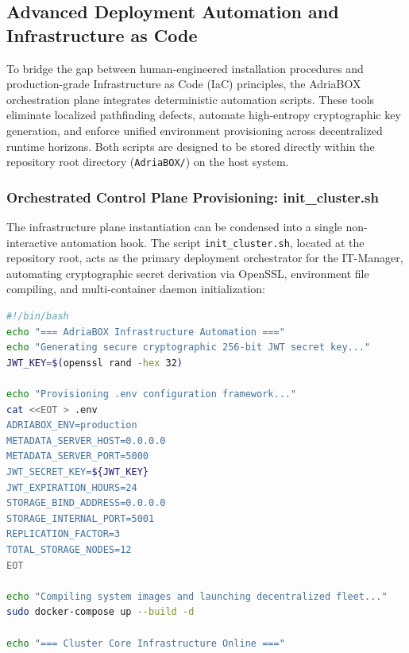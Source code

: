 \subsection{Advanced Deployment Automation and Infrastructure as Code}
To bridge the gap between human-engineered installation procedures and production-grade Infrastructure as Code (IaC) principles, the AdriaBOX orchestration plane integrates deterministic automation scripts. These tools eliminate localized pathfinding defects, automate high-entropy cryptographic key generation, and enforce unified environment provisioning across decentralized runtime horizons. Both scripts are designed to be stored directly within the repository root directory (\texttt{AdriaBOX/}) on the host system.

\subsubsection{Orchestrated Control Plane Provisioning: init\_cluster.sh}
The infrastructure plane instantiation can be condensed into a single non-interactive automation hook. The script \texttt{init\_cluster.sh}, located at the repository root, acts as the primary deployment orchestrator for the IT-Manager, automating cryptographic secret derivation via OpenSSL, environment file compiling, and multi-container daemon initialization:

\begin{lstlisting}[language=bash, basicstyle=\small\ttfamily, frame=single, keepspaces=true, columns=flexible, showspaces=false, showstringspaces=false, breaklines=true]
#!/bin/bash
echo "=== AdriaBOX Infrastructure Automation ==="
echo "Generating secure cryptographic 256-bit JWT secret key..."
JWT_KEY=$(openssl rand -hex 32)

echo "Provisioning .env configuration framework..."
cat <<EOT > .env
ADRIABOX_ENV=production
METADATA_SERVER_HOST=0.0.0.0
METADATA_SERVER_PORT=5000
JWT_SECRET_KEY=${JWT_KEY}
JWT_EXPIRATION_HOURS=24
STORAGE_BIND_ADDRESS=0.0.0.0
STORAGE_INTERNAL_PORT=5001
REPLICATION_FACTOR=3
TOTAL_STORAGE_NODES=12
EOT

echo "Compiling system images and launching decentralized fleet..."
sudo docker-compose up --build -d

echo "=== Cluster Core Infrastructure Online ==="
\end{lstlisting}

